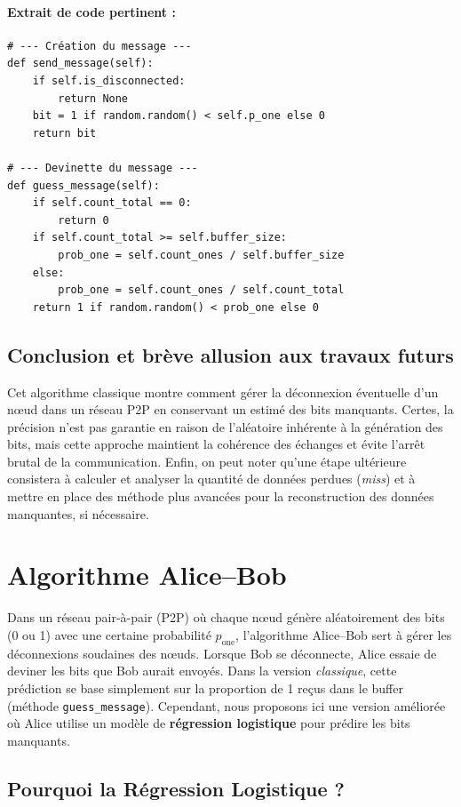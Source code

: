 \documentclass[a4paper,12pt]{article}
\begin{document}
\paragraph{Extrait de code pertinent :}
\begin{verbatim}
# --- Création du message ---
def send_message(self):
    if self.is_disconnected:
        return None
    bit = 1 if random.random() < self.p_one else 0
    return bit

# --- Devinette du message ---
def guess_message(self):
    if self.count_total == 0:
        return 0
    if self.count_total >= self.buffer_size:
        prob_one = self.count_ones / self.buffer_size
    else:
        prob_one = self.count_ones / self.count_total
    return 1 if random.random() < prob_one else 0
\end{verbatim}

\subsection{Conclusion et brève allusion aux travaux futurs}
Cet algorithme classique montre comment gérer la déconnexion éventuelle d'un nœud dans un réseau P2P en conservant un estimé des bits manquants. Certes, la précision n'est pas garantie en raison de l'aléatoire inhérente à la génération des bits, mais cette approche maintient la cohérence des échanges et évite l'arrêt brutal de la communication. Enfin, on peut noter qu'une étape ultérieure consistera à calculer et analyser la quantité de données perdues (\emph{miss}) et à mettre en place des méthode plus avancées pour la reconstruction des données manquantes, si nécessaire.



\section{Algorithme Alice--Bob}
Dans un réseau pair-à-pair (P2P) où chaque nœud génère aléatoirement des bits (0 ou 1) avec une certaine probabilité $p_{\text{one}}$, l’algorithme Alice--Bob sert à gérer les déconnexions soudaines des nœuds. Lorsque Bob se déconnecte, Alice essaie de deviner les bits que Bob aurait envoyés. Dans la version \textit{classique}, cette prédiction se base simplement sur la proportion de 1 reçus dans le buffer (méthode \texttt{guess\_message}). Cependant, nous proposons ici une version améliorée où Alice utilise un modèle de \textbf{régression logistique} pour prédire les bits manquants.

\subsection{Pourquoi la Régression Logistique ?}
\end{document}
